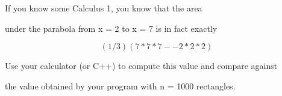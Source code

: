 If you know some Calculus 1, you know that the area

under the parabola from x = 2 to x = 7 is in fact exactly

\[(1 / 3)(7 * 7 * 7 -- 2 * 2 * 2)\]



Use your calculator (or C++) to compute this value and compare against

the value obtained by your program with n = 1000 rectangles.

